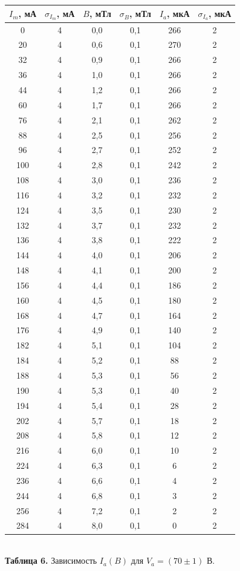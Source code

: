 \documentclass[a4paper, 12pt]{article}%
\begin{document}
\begin{center}
\begin{tabular}{|c|c|c|c|c|c|}
\hline
$I_m$, мА & $\sigma_{I_m}$, мА & $B$, мТл & $\sigma_B$, мТл & $I_a$, мкА & $\sigma_{I_a}$, мкА \\ \hline
0 & 4 & 0,0 & 0,1 & 266 & 2 \\ \hline
20 & 4 & 0,6 & 0,1 & 270 & 2 \\ \hline
32 & 4 & 0,9 & 0,1 & 266 & 2 \\ \hline
36 & 4 & 1,0 & 0,1 & 266 & 2 \\ \hline
44 & 4 & 1,2 & 0,1 & 266 & 2 \\ \hline
60 & 4 & 1,7 & 0,1 & 266 & 2 \\ \hline
76 & 4 & 2,1 & 0,1 & 262 & 2 \\ \hline
88 & 4 & 2,5 & 0,1 & 256 & 2 \\ \hline
96 & 4 & 2,7 & 0,1 & 252 & 2 \\ \hline
100 & 4 & 2,8 & 0,1 & 242 & 2 \\ \hline
108 & 4 & 3,0 & 0,1 & 236 & 2 \\ \hline
116 & 4 & 3,2 & 0,1 & 232 & 2 \\ \hline
124 & 4 & 3,5 & 0,1 & 230 & 2 \\ \hline
132 & 4 & 3,7 & 0,1 & 232 & 2 \\ \hline
136 & 4 & 3,8 & 0,1 & 222 & 2 \\ \hline
144 & 4 & 4,0 & 0,1 & 206 & 2 \\ \hline
148 & 4 & 4,1 & 0,1 & 200 & 2 \\ \hline
156 & 4 & 4,4 & 0,1 & 186 & 2 \\ \hline
160 & 4 & 4,5 & 0,1 & 180 & 2 \\ \hline
168 & 4 & 4,7 & 0,1 & 164 & 2 \\ \hline
176 & 4 & 4,9 & 0,1 & 140 & 2 \\ \hline
182 & 4 & 5,1 & 0,1 & 104 & 2 \\ \hline
184 & 4 & 5,2 & 0,1 & 88 & 2 \\ \hline
188 & 4 & 5,3 & 0,1 & 56 & 2 \\ \hline
190 & 4 & 5,3 & 0,1 & 40 & 2 \\ \hline
194 & 4 & 5,4 & 0,1 & 28 & 2 \\ \hline
202 & 4 & 5,7 & 0,1 & 18 & 2 \\ \hline
208 & 4 & 5,8 & 0,1 & 12 & 2 \\ \hline
216 & 4 & 6,0 & 0,1 & 10 & 2 \\ \hline
224 & 4 & 6,3 & 0,1 & 6 & 2 \\ \hline
236 & 4 & 6,6 & 0,1 & 4 & 2 \\ \hline
244 & 4 & 6,8 & 0,1 & 3 & 2 \\ \hline
256 & 4 & 7,2 & 0,1 & 2 & 2 \\ \hline
284 & 4 & 8,0 & 0,1 & 0 & 2 \\ \hline
\end{tabular}\\
\textbf{Таблица 6.} Зависимость $I_a(B)$ для $V_a = (70 \pm 1)$ В.
\end{center}
\end{document}
